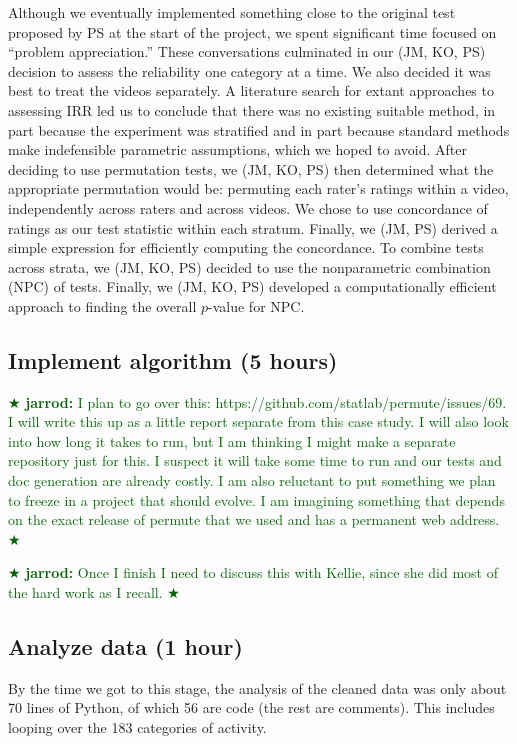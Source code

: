 \documentclass[]{article}
\newcommand{\jarrod}[1] { \textcolor{darkgreen} {
\ensuremath{\bigstar} {\bf jarrod:}  {#1}
\ensuremath{\bigstar} } }
\begin{document}
Although we eventually implemented something close to the original test
proposed by PS at the start of the project, we spent significant time focused
on  ``problem appreciation.''
These conversations culminated in our (JM, KO, PS) decision to assess the
reliability one category at a time.
We also decided it was best to treat the videos separately.
A literature search for extant approaches to assessing IRR led us to conclude
that there was no existing suitable method, in part because the experiment was
stratified and in part because standard methods make indefensible parametric
assumptions, which we hoped to avoid.
After deciding to use permutation tests, we (JM, KO, PS) then determined what
the appropriate permutation would be: permuting each rater's ratings within a
video, independently across raters and across videos.
We chose to use concordance of ratings as our test statistic within each
stratum.
Finally, we (JM, PS) derived a simple expression for efficiently computing the
concordance.
To combine tests across strata, we (JM, KO, PS) decided to use the nonparametric
combination (NPC) of tests.
Finally, we (JM, KO, PS) developed a computationally efficient approach to
finding the overall $p$-value for NPC.

\subsection{Implement algorithm (5 hours)}

\jarrod{I plan to go over this:  https://github.com/statlab/permute/issues/69.
I will write this up as a little report separate from this case study.  I will
also look into how long it takes to run, but I am thinking I might make a
separate repository just for this.  I suspect it will take some time to run and
our tests and doc generation are already costly.  I am also reluctant to put
something we plan to freeze in a project that should evolve.  I am imagining
something that depends on the exact release of permute that we used and has a
permanent web address.}

\jarrod{Once I finish I need to discuss this with Kellie, since she did most of
the hard work as I recall.}
  

\subsection{Analyze data (1 hour)}

By the time we got to this stage, the analysis of the cleaned data was only
about 70 lines of Python, of which 56 are code (the rest are comments).
This includes looping over the 183 categories of activity.
\end{document}
